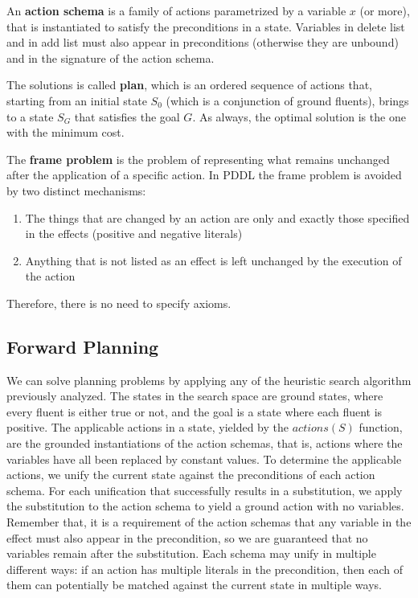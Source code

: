 \documentclass{article}
\begin{document}
An \textbf{action schema} is a family of actions parametrized by a variable $x$ (or more), that is instantiated to satisfy the preconditions in a state. Variables in delete list and in add list must also appear in preconditions (otherwise they are unbound) and in the signature of the action schema.

The solutions is called \textbf{plan}, which is an ordered sequence of actions that, starting from an initial state $S_0$ (which is a conjunction of ground fluents), brings to a state $S_G$ that satisfies the goal $G$. As always, the optimal solution is the one with the minimum cost. 

The \textbf{frame problem} is the problem of representing what remains unchanged after the application of a specific action. In PDDL the frame problem is avoided by two distinct mechanisms:
\begin{enumerate}
    \item The things that are changed by an action are only and exactly those specified in the effects (positive and negative literals)
    \item Anything that is not listed as an effect is left unchanged by the execution of the action
\end{enumerate}

Therefore, there is no need to specify axioms.

\subsection{Forward Planning}
We can solve planning problems by applying any of the heuristic search algorithm previously analyzed. The states in the search space are ground states, where every fluent is either true or not, and the goal is a state where each fluent is positive. The applicable actions in a state, yielded by the $actions(S)$ function, are the grounded instantiations of the action schemas, that is, actions where the variables have all been replaced by constant values. To determine the applicable actions, we unify the current state against the preconditions of each action schema. For each unification that successfully results in a substitution, we apply the substitution to the action schema to yield a ground action with no variables. Remember that, it is a requirement of the action schemas that any variable in the effect must also appear in the precondition, so we are guaranteed that no variables remain after the substitution. Each schema may unify in multiple different ways: if an action has multiple literals in the precondition, then each of them can potentially be matched against the current state in multiple ways.
\end{document}
